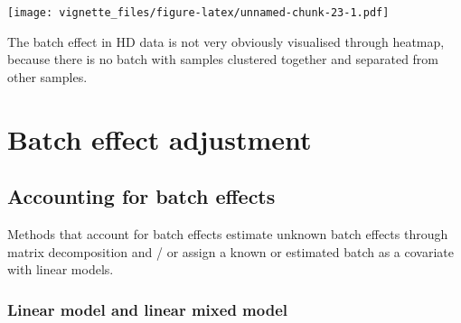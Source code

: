 \documentclass[]{book}
\begin{document}
\texttt{[image: vignette\_files/figure-latex/unnamed-chunk-23-1.pdf]}

The batch effect in HD data is not very obviously visualised through
heatmap, because there is no batch with samples clustered together and
separated from other samples.

\chapter{Batch effect adjustment}\label{adjust}

\section{Accounting for batch
effects}\label{accounting-for-batch-effects}

Methods that account for batch effects estimate unknown batch effects
through matrix decomposition and / or assign a known or estimated batch
as a covariate with linear models.

\subsection{Linear model and linear mixed
model}\label{linear-model-and-linear-mixed-model}
\end{document}
